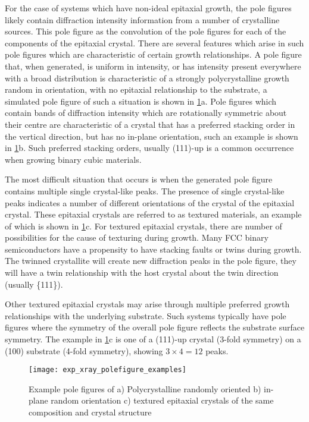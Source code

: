 For the case of systems which have non-ideal epitaxial growth, the pole figures likely contain diffraction intensity information from a number of crystalline sources. This pole figure as the convolution of the pole figures for each of the components of the epitaxial crystal. There are several features which arise in such pole figures which are characteristic of certain growth relationships. A pole figure that, when generated, is uniform in intensity, or has intensity present everywhere with a broad distribution is characteristic of a strongly polycrystalline growth random in orientation, with no epitaxial relationship to the substrate, a simulated pole figure of such a situation is shown in \cref{fig:exp_xray_polefigure_examples}a. Pole figures which contain bands of diffraction intensity which are rotationally symmetric about their centre are characteristic of a crystal that has a preferred stacking order in the vertical direction, but has no in-plane orientation, such an example is shown in \cref{fig:exp_xray_polefigure_examples}b. Such preferred stacking orders, usually (111)-up is a common occurrence when growing binary cubic materials.

The most difficult situation that occurs is when the generated pole figure contains multiple single crystal-like peaks. The presence of single crystal-like peaks indicates a number of different orientations of the crystal of the epitaxial crystal. These epitaxial crystals are referred to as textured materials, an example of which is shown in \cref{fig:exp_xray_polefigure_examples}c. For textured epitaxial crystals, there are number of possibilities for the cause of texturing during growth. Many FCC binary semiconductors have a propensity to have stacking faults or twins during growth. The twinned crystallite will create new diffraction peaks in the pole figure, they will have a twin relationship with the host crystal about the twin direction (usually \{111\}).

Other textured epitaxial crystals may arise through multiple preferred growth relationships with the underlying substrate. Such systems typically have pole figures where the symmetry of the overall pole figure reflects the substrate surface symmetry. The example in \cref{fig:exp_xray_polefigure_examples}c is one of a (111)-up crystal (3-fold symmetry) on a (100) substrate (4-fold symmetry), showing $3\times 4=12$ peaks.
\begin{figure}
    \centering
    \texttt{[image: exp\_xray\_polefigure\_examples]}
    \caption{\label{fig:exp_xray_polefigure_examples}Example pole figures of a) Polycrystalline randomly oriented b) in-plane random orientation c) textured epitaxial crystals of the same composition and crystal structure}
\end{figure}

